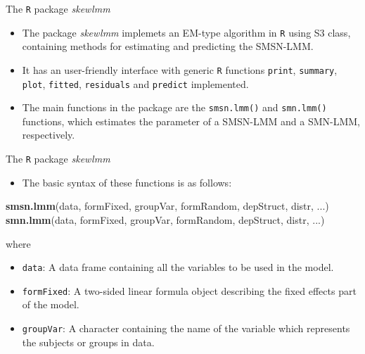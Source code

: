 \documentclass[
  ignorenonframetext,
]{beamer}
\newenvironment{Shaded}{\begin{snugshade}}{\end{snugshade}}
\newcommand{\KeywordTok}[1]{\textcolor[rgb]{0.13,0.29,0.53}{\textbf{#1}}}
\newcommand{\NormalTok}[1]{#1}
\providecommand{\tightlist}{%
  \setlength{\itemsep}{0pt}\setlength{\parskip}{0pt}}
\begin{document}
\begin{frame}[fragile]{The \texttt{R} package \emph{skewlmm}}
\protect\hypertarget{the-package}{}

\begin{itemize}
\item
  The package \emph{skewlmm} implemets an EM-type algorithm in
  \texttt{R} using S3 class, containing methods for estimating and
  predicting the SMSN-LMM.
\item
  It has an user-friendly interface with generic \texttt{R} functions
  \texttt{print}, \texttt{summary}, \texttt{plot}, \texttt{fitted},
  \texttt{residuals} and \texttt{predict} implemented.
\item
  The main functions in the package are the \texttt{smsn.lmm()} and
  \texttt{smn.lmm()} functions, which estimates the parameter of a
  SMSN-LMM and a SMN-LMM, respectively.
\end{itemize}

\end{frame}

\begin{frame}[fragile]{The \texttt{R} package \emph{skewlmm}}
\protect\hypertarget{the-package-1}{}

\begin{itemize}
\tightlist
\item
  The basic syntax of these functions is as follows:
\end{itemize}

\begin{Shaded}
\begin{Highlighting}[]
\KeywordTok{smsn.lmm}\NormalTok{(data, formFixed, groupVar, formRandom, }
\NormalTok{         depStruct, distr, ...)}
\KeywordTok{smn.lmm}\NormalTok{(data, formFixed, groupVar, formRandom, }
\NormalTok{        depStruct, distr, ...)}
\end{Highlighting}
\end{Shaded}

where

\begin{itemize}
\item
  \texttt{data}: A data frame containing all the variables to be used in
  the model.
\item
  \texttt{formFixed}: A two-sided linear formula object describing the
  fixed effects part of the model.
\item
  \texttt{groupVar}: A character containing the name of the variable
  which represents the subjects or groups in data.
\end{itemize}

\end{frame}
\end{document}
